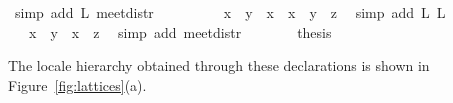 \begin{isabellebody}
\ {\isacharparenleft}simp\ add{\isacharcolon}\ L{}\ meet{\isacharunderscore}distr{\isacharparenright}\isanewline
\ \ \ \ \isamarkupfalse%
\ \isamarkupfalse%
\ {\isachardoublequoteopen}{\isachardot}{\isachardot}{\isachardot}\ {\isacharequal}\ {\isacharparenleft}{\isacharparenleft}x\ {\isasymsqunion}\ y{\isacharparenright}\ {\isasymsqinter}\ x{\isacharparenright}\ {\isasymsqunion}\ {\isacharparenleft}{\isacharparenleft}x\ {\isasymsqunion}\ y{\isacharparenright}\ {\isasymsqinter}\ z{\isacharparenright}{\isachardoublequoteclose}\ \isamarkupfalse%
\ {\isacharparenleft}simp\ add{\isacharcolon}\ L{}\ L{}{\isacharparenright}\isanewline
\ \ \ \ \isamarkupfalse%
\ \isamarkupfalse%
\ {\isachardoublequoteopen}{\isachardot}{\isachardot}{\isachardot}\ {\isacharequal}\ {\isacharparenleft}x\ {\isasymsqunion}\ y{\isacharparenright}\ {\isasymsqinter}\ {\isacharparenleft}x\ {\isasymsqunion}\ z{\isacharparenright}{\isachardoublequoteclose}\ \isamarkupfalse%
\ {\isacharparenleft}simp\ add{\isacharcolon}\ meet{\isacharunderscore}distr{\isacharparenright}\isanewline
\ \ \ \ \isamarkupfalse%
\ \isamarkupfalse%
\ {\isacharquery}thesis\ \isacommand{{\isachardot}}\isamarkupfalse%
\isanewline
\ \ \isamarkupfalse%
%
\endisatagproof
{\isafoldproof}%
%
\isadelimproof
%
\endisadelimproof
%
\begin{isamarkuptext}%
The locale hierarchy obtained through these declarations is shown in
  Figure~\ref{fig:lattices}(a).


\end{isamarkuptext}
\end{isabellebody}
